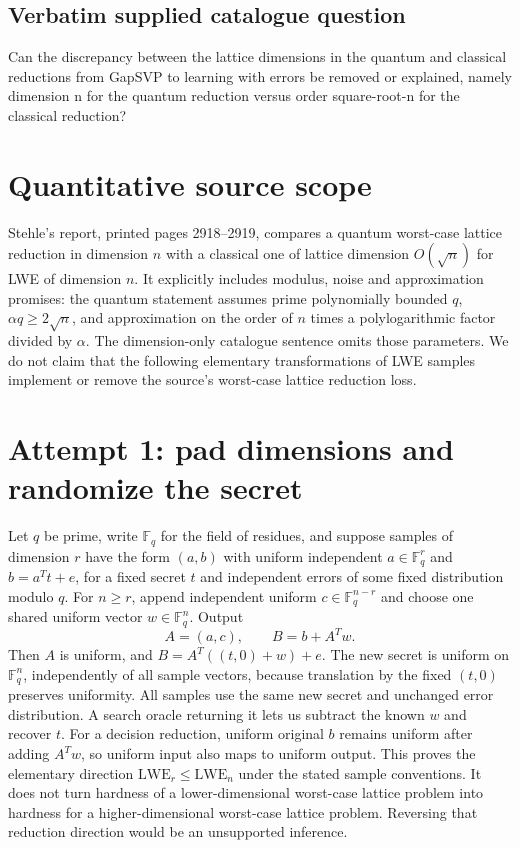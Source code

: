 \documentclass[11pt]{article}
\begin{document}
\subsection{Verbatim supplied catalogue question}
Can the discrepancy between the lattice dimensions in the quantum and classical reductions from GapSVP to learning with errors be removed or explained, namely dimension n for the quantum reduction versus order square-root-n for the classical reduction?

\section{Quantitative source scope}
Stehle's report, printed pages 2918--2919, compares a quantum worst-case
lattice reduction in dimension $n$ with a classical one of lattice dimension
$O(\sqrt n)$ for LWE of dimension $n$. It explicitly includes modulus,
noise and approximation promises: the quantum statement assumes prime
polynomially bounded $q$, $\alpha q\ge2\sqrt n$, and approximation on the
order of $n$ times a polylogarithmic factor divided by $\alpha$.
The dimension-only catalogue sentence omits those parameters. We do not
claim that the following elementary transformations of LWE samples implement
or remove the source's worst-case lattice reduction loss.

\section{Attempt 1: pad dimensions and randomize the secret}
Let $q$ be prime, write $\mathbb F_q$ for the field of residues, and suppose
samples of dimension $r$ have the form $(a,b)$ with uniform independent
$a\in\mathbb F_q^r$ and $b=a^Tt+e$, for a fixed secret $t$ and independent
errors of some fixed distribution modulo $q$. For $n\ge r$, append independent
uniform $c\in\mathbb F_q^{n-r}$ and choose one shared uniform vector
$w\in\mathbb F_q^n$. Output
\[
A=(a,c),\qquad B=b+A^Tw.
\]
Then $A$ is uniform, and $B=A^T((t,0)+w)+e$. The new secret is uniform on
$\mathbb F_q^n$, independently of all sample vectors, because translation
by the fixed $(t,0)$ preserves uniformity. All samples use the same new
secret and unchanged error distribution. A search oracle returning it lets
us subtract the known $w$ and recover $t$. For a decision reduction, uniform
original $b$ remains uniform after adding $A^Tw$, so uniform input also
maps to uniform output. This proves the elementary direction
$\mathrm{LWE}_r\le\mathrm{LWE}_n$ under the stated sample conventions.
It does not turn hardness of a lower-dimensional worst-case lattice problem
into hardness for a higher-dimensional worst-case lattice problem. Reversing
that reduction direction would be an unsupported inference.
\end{document}
